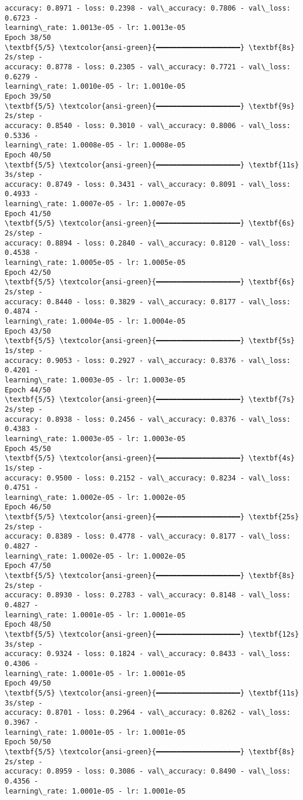 \documentclass[11pt]{article}
\begin{document}
\begin{Verbatim}[commandchars=\\\{\}]
accuracy: 0.8971 - loss: 0.2398 - val\_accuracy: 0.7806 - val\_loss: 0.6723 -
learning\_rate: 1.0013e-05 - lr: 1.0013e-05
Epoch 38/50
\textbf{5/5} \textcolor{ansi-green}{━━━━━━━━━━━━━━━━━━━━} \textbf{8s} 2s/step -
accuracy: 0.8778 - loss: 0.2305 - val\_accuracy: 0.7721 - val\_loss: 0.6279 -
learning\_rate: 1.0010e-05 - lr: 1.0010e-05
Epoch 39/50
\textbf{5/5} \textcolor{ansi-green}{━━━━━━━━━━━━━━━━━━━━} \textbf{9s} 2s/step -
accuracy: 0.8540 - loss: 0.3010 - val\_accuracy: 0.8006 - val\_loss: 0.5336 -
learning\_rate: 1.0008e-05 - lr: 1.0008e-05
Epoch 40/50
\textbf{5/5} \textcolor{ansi-green}{━━━━━━━━━━━━━━━━━━━━} \textbf{11s} 3s/step -
accuracy: 0.8749 - loss: 0.3431 - val\_accuracy: 0.8091 - val\_loss: 0.4933 -
learning\_rate: 1.0007e-05 - lr: 1.0007e-05
Epoch 41/50
\textbf{5/5} \textcolor{ansi-green}{━━━━━━━━━━━━━━━━━━━━} \textbf{6s} 2s/step -
accuracy: 0.8894 - loss: 0.2840 - val\_accuracy: 0.8120 - val\_loss: 0.4538 -
learning\_rate: 1.0005e-05 - lr: 1.0005e-05
Epoch 42/50
\textbf{5/5} \textcolor{ansi-green}{━━━━━━━━━━━━━━━━━━━━} \textbf{6s} 2s/step -
accuracy: 0.8440 - loss: 0.3829 - val\_accuracy: 0.8177 - val\_loss: 0.4874 -
learning\_rate: 1.0004e-05 - lr: 1.0004e-05
Epoch 43/50
\textbf{5/5} \textcolor{ansi-green}{━━━━━━━━━━━━━━━━━━━━} \textbf{5s} 1s/step -
accuracy: 0.9053 - loss: 0.2927 - val\_accuracy: 0.8376 - val\_loss: 0.4201 -
learning\_rate: 1.0003e-05 - lr: 1.0003e-05
Epoch 44/50
\textbf{5/5} \textcolor{ansi-green}{━━━━━━━━━━━━━━━━━━━━} \textbf{7s} 2s/step -
accuracy: 0.8938 - loss: 0.2456 - val\_accuracy: 0.8376 - val\_loss: 0.4383 -
learning\_rate: 1.0003e-05 - lr: 1.0003e-05
Epoch 45/50
\textbf{5/5} \textcolor{ansi-green}{━━━━━━━━━━━━━━━━━━━━} \textbf{4s} 1s/step -
accuracy: 0.9500 - loss: 0.2152 - val\_accuracy: 0.8234 - val\_loss: 0.4751 -
learning\_rate: 1.0002e-05 - lr: 1.0002e-05
Epoch 46/50
\textbf{5/5} \textcolor{ansi-green}{━━━━━━━━━━━━━━━━━━━━} \textbf{25s} 2s/step -
accuracy: 0.8389 - loss: 0.4778 - val\_accuracy: 0.8177 - val\_loss: 0.4827 -
learning\_rate: 1.0002e-05 - lr: 1.0002e-05
Epoch 47/50
\textbf{5/5} \textcolor{ansi-green}{━━━━━━━━━━━━━━━━━━━━} \textbf{8s} 2s/step -
accuracy: 0.8930 - loss: 0.2783 - val\_accuracy: 0.8148 - val\_loss: 0.4827 -
learning\_rate: 1.0001e-05 - lr: 1.0001e-05
Epoch 48/50
\textbf{5/5} \textcolor{ansi-green}{━━━━━━━━━━━━━━━━━━━━} \textbf{12s} 3s/step -
accuracy: 0.9324 - loss: 0.1824 - val\_accuracy: 0.8433 - val\_loss: 0.4306 -
learning\_rate: 1.0001e-05 - lr: 1.0001e-05
Epoch 49/50
\textbf{5/5} \textcolor{ansi-green}{━━━━━━━━━━━━━━━━━━━━} \textbf{11s} 3s/step -
accuracy: 0.8701 - loss: 0.2964 - val\_accuracy: 0.8262 - val\_loss: 0.3967 -
learning\_rate: 1.0001e-05 - lr: 1.0001e-05
Epoch 50/50
\textbf{5/5} \textcolor{ansi-green}{━━━━━━━━━━━━━━━━━━━━} \textbf{8s} 2s/step -
accuracy: 0.8959 - loss: 0.3086 - val\_accuracy: 0.8490 - val\_loss: 0.4356 -
learning\_rate: 1.0001e-05 - lr: 1.0001e-05
    \end{Verbatim}
\end{document}
